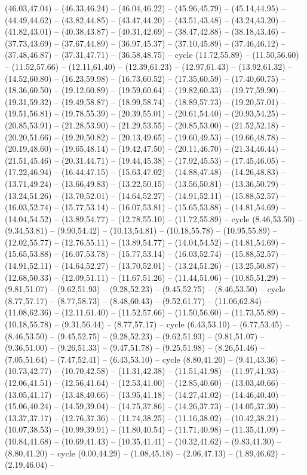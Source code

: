 {(46.03,47.04) -- (46.33,46.24) -- (46.04,46.22) -- (45.96,45.79) -- (45.14,44.95) -- (44.49,44.62) -- (43.82,44.85) -- (43.47,44.20) -- (43.51,43.48) -- (43.24,43.20) -- (41.82,43.01) -- (40.38,43.87) -- (40.31,42.69) -- (38.47,42.88) -- (38.18,43.46) -- (37.73,43.69) -- (37.67,44.89) -- (36.97,45.37) -- (37.10,45.89) -- (37.46,46.12) -- (37.48,46.87) -- (37.31,47.71) -- (36.58,48.75) -- cycle (11.72,55.89) -- (11.50,56.60) -- (11.52,57.66) -- (12.11,61.40) -- (12.39,61.23) -- (12.97,61.43) -- (13.92,61.32) -- (14.52,60.80) -- (16.23,59.98) -- (16.73,60.52) -- (17.35,60.59) -- (17.40,60.75) -- (18.36,60.50) -- (19.12,60.89) -- (19.59,60.64) -- (19.82,60.33) -- (19.77,59.90) -- (19.31,59.32) -- (19.49,58.87) -- (18.99,58.74) -- (18.89,57.73) -- (19.20,57.01) -- (19.51,56.81) -- (19.78,55.39) -- (20.39,55.01) -- (20.61,54.40) -- (20.93,54.25) -- (20.85,53.91) -- (21.28,53.90) -- (21.29,53.55) -- (20.85,53.00) -- (21.52,52.18) -- (20.20,51.66) -- (19.20,50.82) -- (20.13,49.65) -- (19.60,49.53) -- (19.66,48.78) -- (20.19,48.60) -- (19.65,48.14) -- (19.42,47.50) -- (20.11,46.70) -- (21.34,46.44) -- (21.51,45.46) -- (20.31,44.71) -- (19.44,45.38) -- (17.92,45.53) -- (17.45,46.05) -- (17.22,46.94) -- (16.44,47.15) -- (15.63,47.02) -- (14.88,47.48) -- (14.26,48.83) -- (13.71,49.24) -- (13.66,49.83) -- (13.22,50.15) -- (13.56,50.81) -- (13.36,50.79) -- (13.24,51.26) -- (13.70,52.01) -- (14.64,52.27) -- (14.91,52.11) -- (15.88,52.57) -- (16.03,52.74) -- (15.77,53.14) -- (16.07,53.81) -- (15.65,53.88) -- (14.81,54.69) -- (14.04,54.52) -- (13.89,54.77) -- (12.78,55.10) -- (11.72,55.89) -- cycle (8.46,53.50) -- (9.34,53.81) -- (9.90,54.42) -- (10.13,54.81) -- (10.18,55.78) -- (10.95,55.89) -- (12.02,55.77) -- (12.76,55.11) -- (13.89,54.77) -- (14.04,54.52) -- (14.81,54.69) -- (15.65,53.88) -- (16.07,53.78) -- (15.77,53.14) -- (16.03,52.74) -- (15.88,52.57) -- (14.91,52.11) -- (14.64,52.27) -- (13.70,52.01) -- (13.24,51.26) -- (13.25,50.87) -- (12.68,50.33) -- (12.09,51.11) -- (11.67,51.26) -- (11.44,51.06) -- (10.85,51.29) -- (9.81,51.07) -- (9.62,51.93) -- (9.28,52.23) -- (9.45,52.75) -- (8.46,53.50) -- cycle (8.77,57.17) -- (8.77,58.73) -- (8.48,60.43) -- (9.52,61.77) -- (11.06,62.84) -- (11.08,62.36) -- (12.11,61.40) -- (11.52,57.66) -- (11.50,56.60) -- (11.73,55.89) -- (10.18,55.78) -- (9.31,56.44) -- (8.77,57.17) -- cycle (6.43,53.10) -- (6.77,53.45) -- (8.46,53.50) -- (9.45,52.75) -- (9.28,52.23) -- (9.62,51.93) -- (9.81,51.07) -- (9.36,51.00) -- (9.26,51.33) -- (9.47,51.78) -- (9.25,51.98) -- (8.26,51.46) -- (7.05,51.64) -- (7.47,52.41) -- (6.43,53.10) -- cycle (8.80,41.20) -- (9.41,43.36) -- (10.73,42.77) -- (10.70,42.58) -- (11.31,42.38) -- (11.51,41.98) -- (11.97,41.93) -- (12.06,41.51) -- (12.56,41.64) -- (12.53,41.00) -- (12.85,40.60) -- (13.03,40.66) -- (13.05,41.17) -- (13.48,40.66) -- (13.95,41.18) -- (14.27,41.02) -- (14.46,40.40) -- (15.06,40.24) -- (14.59,39.04) -- (14.75,37.86) -- (14.26,37.73) -- (14.05,37.30) -- (13.37,37.17) -- (12.76,37.36) -- (11.74,38.25) -- (11.16,38.02) -- (10.42,38.21) -- (10.07,38.53) -- (10.99,39.91) -- (11.80,40.54) -- (11.71,40.98) -- (11.35,41.09) -- (10.84,41.68) -- (10.69,41.43) -- (10.35,41.41) -- (10.32,41.62) -- (9.83,41.30) -- (8.80,41.20) -- cycle (0.00,44.29) -- (1.08,45.18) -- (2.06,47.13) -- (1.89,46.62) -- (2.19,46.04) -- }
